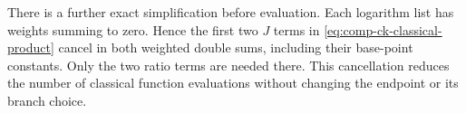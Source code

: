 There is a further exact simplification before evaluation.  Each
logarithm list has weights summing to zero.  Hence the first two
$J$ terms in \eqref{eq:comp-ck-classical-product} cancel in both
weighted double sums, including their base-point constants.
Only the two ratio terms are needed there.  This cancellation
reduces the number of classical function evaluations without
changing the endpoint or its branch choice.
